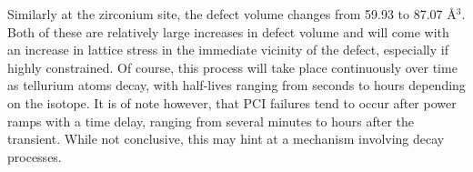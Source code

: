 Similarly at the zirconium site, the defect volume changes from 59.93 to 87.07 \r{A}$^{3}$. Both of these are relatively large increases in defect volume and will come with an increase in lattice stress in the immediate vicinity of the defect, especially if highly constrained. Of course, this  process will take place continuously over time as tellurium atoms decay, with half-lives ranging from seconds to hours depending on the isotope. It is of note however, that PCI failures tend to occur after power ramps with a time delay, ranging from several minutes to hours after the transient. While not conclusive, this may hint at a mechanism involving decay processes. 

